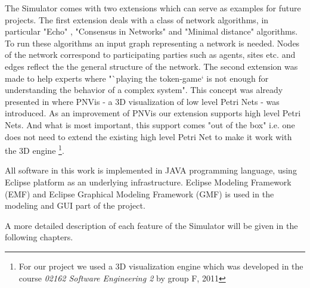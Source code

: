 The Simulator comes with two extensions which can serve as examples for future projects. The first extension deals with a class of network algorithms, in particular "Echo" \cite{echo}, "Consensus in Networks" \cite{reisig} and "Minimal distance" \cite{min-dist} algorithms. To run these algorithms an input graph representing a network is needed. Nodes of the network correspond to participating parties such as agents, sites etc. and edges reflect the the general structure of the network. The second extension was made to help experts where "`playing the token-game` is not enough for understanding the behavior of a complex system". This concept was already presented in \cite{pnvis} where PNVis - a 3D visualization of low level Petri Nets - was introduced. As an improvement of PNVis our extension supports high level Petri Nets. And what is most important, this support comes "out of the box" i.e. one does not need to extend the existing high level Petri Net to make it work with the 3D engine \footnote{For our project we used a 3D visualization engine which was developed in the course \textit{02162 Software Engineering 2} by group F, 2011}. 

All software in this work is implemented in JAVA programming language, using Eclipse platform \cite{website:eclipse} as an underlying infrastructure. Eclipse Modeling Framework (EMF) \cite{website:emf} and Eclipse Graphical Modeling Framework (GMF) \cite{website:gmf} is used in the modeling and GUI part of the project.

A more detailed description of each feature of the Simulator will be given in the following chapters.

